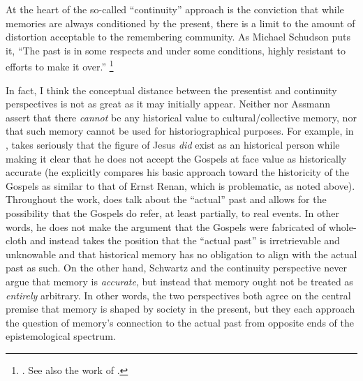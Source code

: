 At the heart of the so-called ``continuity'' approach is the conviction that while memories are always conditioned by the present, there is a limit to the amount of distortion acceptable to the remembering community. As Michael Schudson puts it, ``The past is in some respects and under some conditions, highly resistant to efforts to make it over.''%
    \footnote{%
        \Cite[107]{schudson_communication1989}. See also the work of 
        \cite{molden_ms2016}.}

In fact, I think the conceptual distance between the presentist and continuity perspectives is not as great as it may initially appear. Neither \halbwachs nor Assmann assert that there \emph{cannot} be any historical value to cultural/collective memory, nor that such memory cannot be used for historiographical purposes. For example, in , \halbwachs takes seriously that the figure of Jesus \emph{did} exist as an historical person while making it clear that he does not accept the Gospels at face value as historically accurate (he explicitly compares his basic approach toward the historicity of the Gospels as similar to that of Ernst Renan, which is problematic, as noted above).%
    \autocite[205--206]{halbwachs1992}
Throughout the work, \halbwachs does talk about the ``actual'' past and allows for the possibility that the Gospels do refer, at least partially, to real events. In other words, he does not make the argument that the Gospels were fabricated of whole-cloth and instead takes the position that the ``actual past'' is irretrievable and unknowable and that historical memory has no obligation to align with the actual past as such. On the other hand, Schwartz and the continuity perspective never argue that memory is \emph{accurate}, but instead that memory ought not be treated as \emph{entirely} arbitrary. In other words, the two perspectives both agree on the central premise that memory is shaped by society in the present, but they each approach the question of memory's connection to the actual past from opposite ends of the epistemological spectrum.  

